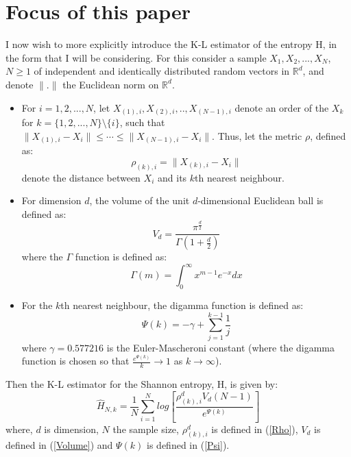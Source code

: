 \documentclass[12pt]{report}
\begin{document}
\section{Focus of this paper} \label{focus}

I now wish to more explicitly introduce the K-L estimator of the entropy H, in the form that I will be considering. For this consider a sample $X_{1}, X_{2}, ... ,X_{N}$, $N \geq 1$ of independent and identically distributed random vectors in $\mathbb{R}^{d}$, and denote $\|.\|$ the Euclidean norm on $\mathbb{R}^{d}$.
 
\begin{itemize}

\item For $i = 1, 2, ..., N$, let $X_{(1), i}, X_{(2), i}, .., X_{(N-1), i}$ denote an order of the $X_{k}$ for $k = \{1, 2, ..., N\} \setminus \{i\}$, such that $\| X_{(1), i} - X_{i}\| \leq \cdots \leq \|  X_{(N-1), i} - X_{i}\| $. Thus, let the metric $\rho$, defined as:
\begin{equation} \label{Rho}
\rho_{(k), i} = \| X_{(k), i} - X_{i}\|
\end{equation} denote the distance between $X_{i}$ and its $k$th nearest neighbour.

\item  For dimension $d$, the volume of the unit $d$-dimensional Euclidean ball is defined as:
\begin{equation} \label{Volume}
V_{d} = \frac{\pi^\frac{d}{2}}{\Gamma(1 + \frac{d}{2})}
\end{equation}
where the $\Gamma$ function is defined as:
\begin{equation} \label{Gamma}
\Gamma(m) = \int_{0}^{\infty} x^{m-1} e^{-x} dx
\end{equation}

\item For the $k$th nearest neighbour, the digamma function is defined as:
\begin{equation} \label{Psi}
\Psi(k) = -\gamma + \sum_{j=1}^{k-1} \frac{1}{j}
\end{equation}
where $\gamma = 0.577216$ is the Euler-Mascheroni constant (where the digamma function is chosen so that $\frac{e^{\Psi(k)}}{k}\to1$ as $k \to \infty$).

\end{itemize} Then the K-L estimator for the Shannon entropy, H, is given by:
\begin{equation} \label{KLest}
\hat{H}_{N, k} = \frac{1}{N} \sum_{i=1}^{N} log \left[ \frac{\rho_{(k),i}^{d} V_{d} (N-1)}{e^{\Psi(k)}} \right]
\end{equation} where, $d$ is dimension, $N$ the sample size, $\rho_{(k),i}^{d}$ is defined in (\ref{Rho}), $V_{d}$ is defined in (\ref{Volume}) and $\Psi(k)$ is defined in (\ref{Psi}). 
\end{document}

